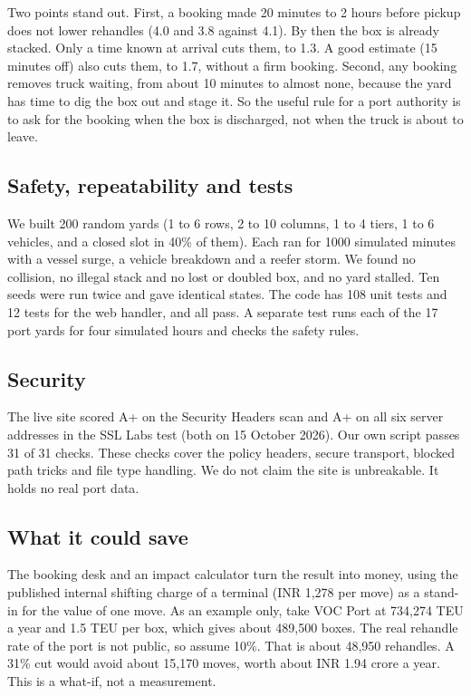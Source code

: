 \documentclass[conference]{IEEEtran}
\begin{document}
Two points stand out. First, a booking made 20 minutes to 2 hours before pickup does not lower rehandles (4.0 and 3.8 against 4.1). By then the box is already stacked. Only a time known at arrival cuts them, to 1.3. A good estimate (15 minutes off) also cuts them, to 1.7, without a firm booking. Second, any booking removes truck waiting, from about 10 minutes to almost none, because the yard has time to dig the box out and stage it. So the useful rule for a port authority is to ask for the booking when the box is discharged, not when the truck is about to leave.

\subsection{Safety, repeatability and tests}
We built 200 random yards (1 to 6 rows, 2 to 10 columns, 1 to 4 tiers, 1 to 6 vehicles, and a closed slot in 40\% of them). Each ran for 1000 simulated minutes with a vessel surge, a vehicle breakdown and a reefer storm. We found no collision, no illegal stack and no lost or doubled box, and no yard stalled. Ten seeds were run twice and gave identical states. The code has 108 unit tests and 12 tests for the web handler, and all pass. A separate test runs each of the 17 port yards for four simulated hours and checks the safety rules.

\subsection{Security}
The live site scored A+ on the Security Headers scan and A+ on all six server addresses in the SSL Labs test (both on 15 October 2026). Our own script passes 31 of 31 checks. These checks cover the policy headers, secure transport, blocked path tricks and file type handling. We do not claim the site is unbreakable. It holds no real port data.

\subsection{What it could save}
The booking desk and an impact calculator turn the result into money, using the published internal shifting charge of a terminal (INR 1,278 per move) as a stand-in for the value of one move. As an example only, take VOC Port at 734,274 TEU a year and 1.5 TEU per box, which gives about 489,500 boxes. The real rehandle rate of the port is not public, so assume 10\%. That is about 48,950 rehandles. A 31\% cut would avoid about 15,170 moves, worth about INR 1.94 crore a year. This is a what-if, not a measurement.
\end{document}
